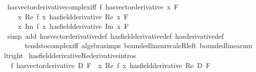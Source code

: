 \begin{isabellebody}
\endisatagproof
{\isafoldproof}%
%
\isadelimproof
\isanewline
%
\endisadelimproof
\isanewline
{}\isamarkupfalse%
\ has{\isacharunderscore}{\kern0pt}vector{\isacharunderscore}{\kern0pt}derivative{\isacharunderscore}{\kern0pt}complex{\isacharunderscore}{\kern0pt}iff{\isacharcolon}{\kern0pt}\ {\isachardoublequoteopen}{\isacharparenleft}{\kern0pt}f\ has{\isacharunderscore}{\kern0pt}vector{\isacharunderscore}{\kern0pt}derivative\ x{\isacharparenright}{\kern0pt}\ F\ {\isasymlongleftrightarrow}\isanewline
\ \ \ \ {\isacharparenleft}{\kern0pt}{\isacharparenleft}{\kern0pt}{\isasymlambda}x{\isachardot}{\kern0pt}\ Re\ {\isacharparenleft}{\kern0pt}f\ x{\isacharparenright}{\kern0pt}{\isacharparenright}{\kern0pt}\ has{\isacharunderscore}{\kern0pt}field{\isacharunderscore}{\kern0pt}derivative\ {\isacharparenleft}{\kern0pt}Re\ x{\isacharparenright}{\kern0pt}{\isacharparenright}{\kern0pt}\ F\ {\isasymand}\isanewline
\ \ \ \ {\isacharparenleft}{\kern0pt}{\isacharparenleft}{\kern0pt}{\isasymlambda}x{\isachardot}{\kern0pt}\ Im\ {\isacharparenleft}{\kern0pt}f\ x{\isacharparenright}{\kern0pt}{\isacharparenright}{\kern0pt}\ has{\isacharunderscore}{\kern0pt}field{\isacharunderscore}{\kern0pt}derivative\ {\isacharparenleft}{\kern0pt}Im\ x{\isacharparenright}{\kern0pt}{\isacharparenright}{\kern0pt}\ F{\isachardoublequoteclose}\isanewline
%
\isadelimproof
\ \ %
\endisadelimproof
%
\isatagproof
{}\isamarkupfalse%
\ {\isacharparenleft}{\kern0pt}simp\ add{\isacharcolon}{\kern0pt}\ has{\isacharunderscore}{\kern0pt}vector{\isacharunderscore}{\kern0pt}derivative{\isacharunderscore}{\kern0pt}def\ has{\isacharunderscore}{\kern0pt}field{\isacharunderscore}{\kern0pt}derivative{\isacharunderscore}{\kern0pt}def\ has{\isacharunderscore}{\kern0pt}derivative{\isacharunderscore}{\kern0pt}def\isanewline
\ \ \ \ \ \ tendsto{\isacharunderscore}{\kern0pt}complex{\isacharunderscore}{\kern0pt}iff\ algebra{\isacharunderscore}{\kern0pt}simps\ bounded{\isacharunderscore}{\kern0pt}linear{\isacharunderscore}{\kern0pt}scaleR{\isacharunderscore}{\kern0pt}left\ bounded{\isacharunderscore}{\kern0pt}linear{\isacharunderscore}{\kern0pt}mult{\isacharunderscore}{\kern0pt}right{\isacharparenright}{\kern0pt}%
\endisatagproof
{\isafoldproof}%
%
\isadelimproof
\isanewline
%
\endisadelimproof
\isanewline
{}\isamarkupfalse%
\ has{\isacharunderscore}{\kern0pt}field{\isacharunderscore}{\kern0pt}derivative{\isacharunderscore}{\kern0pt}Re{\isacharbrackleft}{\kern0pt}derivative{\isacharunderscore}{\kern0pt}intros{\isacharbrackright}{\kern0pt}{\isacharcolon}{\kern0pt}\isanewline
\ \ {\isachardoublequoteopen}{\isacharparenleft}{\kern0pt}f\ has{\isacharunderscore}{\kern0pt}vector{\isacharunderscore}{\kern0pt}derivative\ D{\isacharparenright}{\kern0pt}\ F\ {\isasymLongrightarrow}\ {\isacharparenleft}{\kern0pt}{\isacharparenleft}{\kern0pt}{\isasymlambda}x{\isachardot}{\kern0pt}\ Re\ {\isacharparenleft}{\kern0pt}f\ x{\isacharparenright}{\kern0pt}{\isacharparenright}{\kern0pt}\ has{\isacharunderscore}{\kern0pt}field{\isacharunderscore}{\kern0pt}derivative\ {\isacharparenleft}{\kern0pt}Re\ D{\isacharparenright}{\kern0pt}{\isacharparenright}{\kern0pt}\ F{\isachardoublequoteclose}\isanewline

\end{isabellebody}
